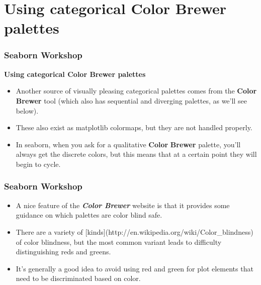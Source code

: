 \documentclass{beamer}
\begin{document}
	\section{Using categorical Color Brewer palettes}
	\begin{frame}[fragile]
		\frametitle{Seaborn Workshop}
		\large
		\textbf{Using categorical Color Brewer palettes}
		\begin{itemize}
			\item Another source of visually pleasing categorical palettes comes from the \textbf{Color} \textbf{Brewer} tool (which also has sequential and diverging palettes, as we’ll see below). 
			\item These also exist as matplotlib colormaps, but they are not handled properly. 
			\item In seaborn, when you ask for a qualitative \textbf{Color} \textbf{Brewer} palette, you’ll always get the discrete colors, but this means that at a certain point they will begin to cycle.
		\end{itemize}
		
	\end{frame}
	\begin{frame}[fragile]
		\frametitle{Seaborn Workshop}
		\large
		\begin{itemize}
			\item A nice feature of the \textbf{\textit{Color Brewer}} website is that it provides some guidance on which palettes are color blind safe. 
			\item There are a variety of [kinds](http://en.wikipedia.org/wiki/Color\_blindness) of color blindness, but the most common variant leads to difficulty distinguishing reds and greens.
			\item It’s generally a good idea to avoid using red and green for plot elements that need to be discriminated based on color.
		\end{itemize}
	\end{frame}
\end{document}
